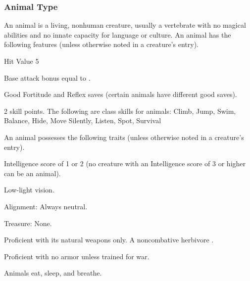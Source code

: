 \subsubsection{Animal Type} An animal is a living, nonhuman creature, usually a vertebrate with no magical abilities and no innate capacity for language or culture.
 An animal has the following features (unless otherwise noted in a creature's entry).
\begin{itemize*}
\item Hit Value 5
\item Base attack bonus equal to .
\item Good Fortitude and Reflex saves (certain animals have different good saves).
\item 2 skill points. The following are class skills for animals: Climb, Jump, Swim, Balance, Hide, Move Silently, Listen, Spot, Survival
\end{itemize*}
 An animal possesses the following traits (unless otherwise noted in a creature's entry).
\begin{itemize*}
\item Intelligence score of 1 or 2 (no creature with an Intelligence score of 3 or higher can be an animal).
\item Low-light vision.
\item Alignment: Always neutral.
\item Treasure: None.
\item Proficient with its natural weapons only. A noncombative herbivore .
\item Proficient with no armor unless trained for war.
\item Animals eat, sleep, and breathe.
\end{itemize*}

